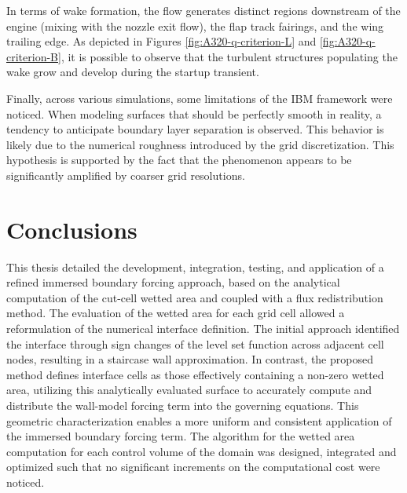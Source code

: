 \documentclass[12pt, a4paper, twoside, openright]{book}
\begin{document}
In terms of wake formation, the flow generates distinct regions downstream of the engine (mixing with the nozzle exit flow), the flap track fairings, and the wing trailing edge. As depicted in Figures \ref{fig:A320-q-criterion-L} and \ref{fig:A320-q-criterion-B}, it is possible to observe that the turbulent structures populating the wake grow and develop during the startup transient.

Finally, across various simulations, some limitations of the IBM framework were noticed. When modeling surfaces that should be perfectly smooth in reality, a tendency to anticipate boundary layer separation is observed. This behavior is likely due to the numerical roughness introduced by the grid discretization. This hypothesis is supported by the fact that the phenomenon appears to be significantly amplified by coarser grid resolutions.

\chapter{Conclusions}
This thesis detailed the development, integration, testing, and application of a refined immersed boundary forcing approach, based on the analytical computation of the cut-cell wetted area and coupled with a flux redistribution method. The evaluation of the wetted area for each grid cell allowed a reformulation of the numerical interface definition. The initial approach identified the interface through sign changes of the level set function across adjacent cell nodes, resulting in a staircase wall approximation. In contrast, the proposed method defines interface cells as those effectively containing a non-zero wetted area, utilizing this analytically evaluated surface to accurately compute and distribute the wall-model forcing term into the governing equations. This geometric characterization enables a more uniform and consistent application of the immersed boundary forcing term. The algorithm for the wetted area computation for each control volume of the domain was designed, integrated and optimized such that no significant increments on the computational cost were noticed.
\end{document}
